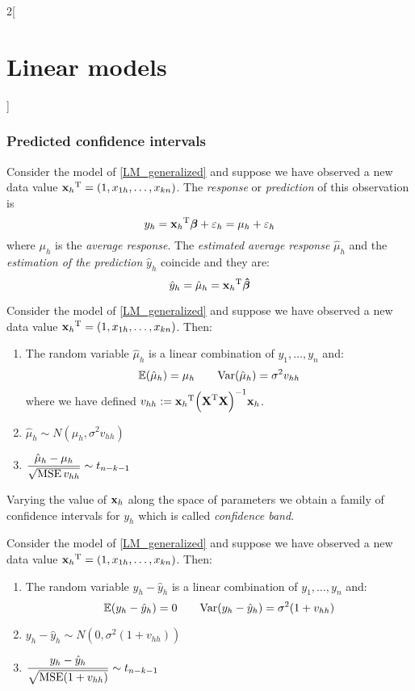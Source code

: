 \documentclass[../../../main_math.tex]{subfiles}
\begin{document}
\begin{multicols}{2}[\section{Linear models}]
  \subsubsection{Predicted confidence intervals}
  \begin{definition}
    Consider the model of \cref{LM_generalized} and suppose we have observed a new data value ${\boldsymbol{\mathrm{x}}_h}^{\mathrm{T}}=(1,x_{1h},\ldots,x_{kn})$. The \emph{response} or \emph{prediction} of this observation is $$y_h={\boldsymbol{\mathrm{x}}_h}^{\mathrm{T}}\boldsymbol{\mathrm{\beta}}+\varepsilon_h=\mu_h+\varepsilon_h$$
    where $\mu_h$ is the \emph{average response}. The \emph{estimated average response} $\hat\mu_h$ and the \emph{estimation of the prediction} $\hat{y}_h$ coincide and they are: $$\hat{y}_h=\hat\mu_h={\boldsymbol{\mathrm{x}}_h}^{\mathrm{T}}\boldsymbol{\mathrm{\hat\beta}}$$
  \end{definition}
  \begin{proposition}
    Consider the model of \cref{LM_generalized} and suppose we have observed a new data value ${\boldsymbol{\mathrm{x}}_h}^{\mathrm{T}}=(1,x_{1h},\ldots,x_{kn})$. Then:
    \begin{enumerate}
      \item The random variable $\hat\mu_h$ is a linear combination of $y_1,\ldots,y_n$ and: $$\mathbb{E}(\hat\mu_h)=\mu_h\qquad\mathrm{Var}(\hat\mu_h)=\sigma^2v_{hh}$$ where we have defined $v_{hh}:={\boldsymbol{\mathrm{x}}_h}^{\mathrm{T}}{\left({\boldsymbol{\mathrm{X}}}^{\mathrm{T}}\boldsymbol{\mathrm{X}}\right)}^{-1}\boldsymbol{\mathrm{x}}_h$.
      \item $\hat\mu_h\sim N(\mu_h,\sigma^2v_{hh})$
      \item $\displaystyle\frac{\hat\mu_h-\mu_h}{\sqrt{\operatorname{MSE} v_{hh}}}\sim t_{n-k-1}$
    \end{enumerate}
    Varying the value of $\boldsymbol{\mathrm{x}}_h$ along the space of parameters we obtain a family of confidence intervals for $y_h$ which is called \emph{confidence band}.
  \end{proposition}
  \begin{proposition}
    Consider the model of \cref{LM_generalized} and suppose we have observed a new data value ${\boldsymbol{\mathrm{x}}_h}^{\mathrm{T}}=(1,x_{1h},\ldots,x_{kn})$. Then:
    \begin{enumerate}
      \item The random variable $y_h-\hat{y}_h$ is a linear combination of $y_1,\ldots,y_n$ and: $$\mathbb{E}(y_h-\hat{y}_h)=0\qquad\mathrm{Var}(y_h-\hat{y}_h)=\sigma^2(1+v_{hh})$$
      \item $y_h-\hat{y}_h\sim N(0,\sigma^2(1+v_{hh}))$
      \item $\displaystyle\frac{y_h-\hat{y}_h}{\sqrt{\operatorname{MSE} (1+v_{hh})}}\sim t_{n-k-1}$

\end{enumerate}
\end{proposition}
\end{multicols}
\end{document}
